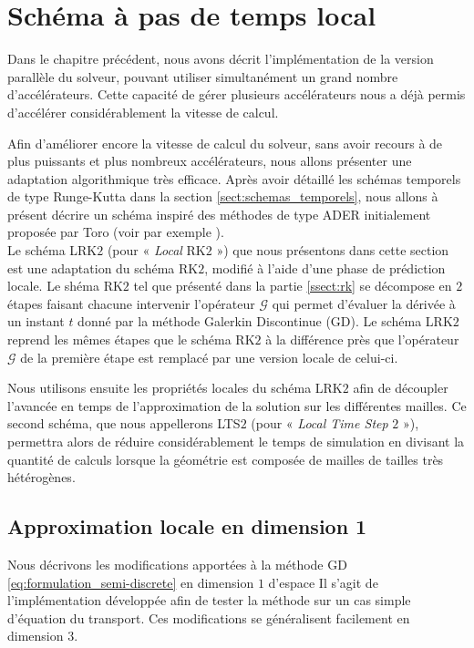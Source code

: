 \chapter{Schéma à pas de temps local}
\label{chap:pas de temps local}

Dans le chapitre précédent, nous avons décrit l'implémentation
de la version parallèle du solveur, pouvant utiliser simultanément
un grand nombre d'accélérateurs.
Cette capacité de gérer plusieurs accélérateurs nous a déjà
permis d'accélérer considérablement la vitesse de calcul.

Afin d'améliorer encore la vitesse de calcul du solveur, sans avoir recours
à de plus puissants et plus nombreux accélérateurs, nous allons présenter une
adaptation algorithmique très efficace.
Après avoir détaillé les schémas temporels de type Runge-Kutta
dans la section \ref{sect:schemas_temporels}, nous allons 
à présent décrire un schéma inspiré des méthodes de type ADER initialement proposée
par Toro (voir par exemple \cite{schwartzkopff2002ader,schwartzkopff2004fast}).
\\

Le schéma LRK$2$ (pour « \textit{Local} RK$2$ ») que nous présentons dans cette section est une adaptation du
schéma RK$2$, modifié à l'aide d'une phase de prédiction locale. Le shéma RK$2$ tel que présenté
dans la partie \ref{ssect:rk} se décompose en $2$ étapes faisant chacune intervenir
l'opérateur $\mathcal{G}$ qui permet d'évaluer la dérivée à un instant $t$ donné
par la méthode Galerkin Discontinue (GD).
Le schéma LRK$2$ reprend les mêmes
étapes que le schéma RK$2$ à la différence près que l'opérateur $\mathcal{G}$ de la première
étape est remplacé par une version locale de celui-ci.

Nous utilisons ensuite les propriétés locales du schéma LRK$2$ afin
de découpler l'avancée en temps de l'approximation de la solution sur
les différentes mailles. Ce second schéma, que nous appellerons
LTS$2$ (pour « \textit{Local Time Step} $2$ »), permettra alors de réduire
considérablement le temps de simulation en divisant la quantité
de calculs lorsque la géométrie est composée de mailles de tailles très hétérogènes.
\\

\section{Approximation locale en dimension 1}
\label{sect:pas de temps local dim 1}

\begin{remark}
	Nous décrivons les modifications apportées à la méthode GD
	\eqref{eq:formulation_semi-discrete} en dimension $1$ d'espace %
	Il s'agit de l'implémentation développée afin de tester
	la méthode sur un cas simple d'équation du transport.
	Ces modifications se généralisent facilement en dimension $3$.
\end{remark}

